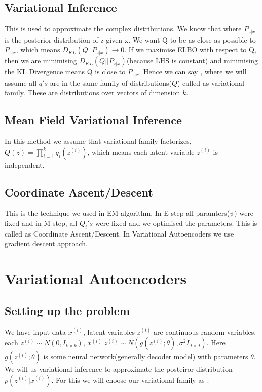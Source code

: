 \documentclass[10pt,a4paper,twoside]{tau-book}
\begin{document}
\subsection{Variational Inference}

This is used to approximate the complex distributions. We know that  where $P_{z|x}$ is the posterior distribution of z given x. We want Q to be as close as possible to $P_{z|x}$, which means $D_{KL}(Q||P_{z|x}) \longrightarrow 0$. If we maximise ELBO with respect to Q, then we are minimising $D_{KL}(Q||P_{z|x})$(because LHS is constant) and minimising the KL Divergence means Q is close to $P_{z|x}$. Hence we can say , where we will assume all $q's$ are in the same family of distributions($Q$) called as variational family. These are distributions over vectors of dimension $k$.

\subsection{Mean Field Variational Inference}
In this method we assume that variational family factorizes,$Q(z) = \prod_{i=1}^{k} q_i(z^{(i)})$, which means each latent variable $z^{(i)}$ is independent.

\subsection{Coordinate Ascent/Descent}
This is the technique we used in EM algorithm. In E-step all paramters($\psi$) were fixed and in M-step, all $Q_i's$ were fixed and we optimised the parameters. This is called as Coordinate Ascent/Descent. In Variational Autoencoders we use gradient descent approach.

\section{Variational Autoencoders}
\subsection{Setting up the problem}
We have input data $x^{(i)}$, latent variables $z^{(i)}$ are continuous random variables, each $z^{(i)} \sim N(0,I_{k \times k})$, $x^{(i)} | z^{(i)} \sim N(g(z^{(i)};\theta),\sigma^2 I_{d \times d})$. Here $g(z^{(i)};\theta)$ is some neural network(generally decoder model) with parameters $\theta$. We will us variational inference to approximate the posteiror distribution $p(z^{(i)}|x^{(i)})$. For this we will choose our variational family as .
\end{document}
